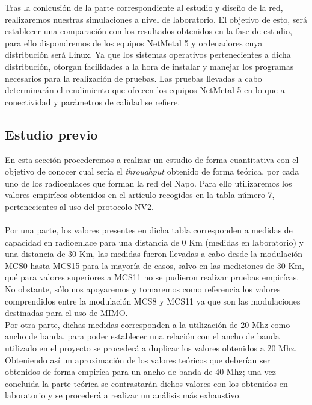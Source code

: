 Tras la conlcusión de la parte correspondiente al estudio y diseño de la red, realizaremos nuestras simulaciones a nivel de laboratorio. El objetivo de esto, será establecer una comparación con los resultados obtenidos en la fase de estudio, para ello dispondremos de los equipos NetMetal 5 y ordenadores cuya distribución será Linux. Ya que los sistemas operativos pertenecientes a dicha distribución, otorgan facilidades a la hora de instalar y manejar los programas necesarios para la realización de pruebas. Las pruebas llevadas a cabo determinarán el rendimiento que ofrecen los equipos NetMetal 5 en lo que a conectividad y parámetros de calidad se refiere.

\subsection{Estudio previo} 
	En esta sección procederemos a realizar un estudio de forma cuantitativa con el objetivo de conocer cual sería el \textit{throughput} obtenido de forma teórica, por cada uno de los radioenlaces que forman la red del Napo. Para ello utilizaremos los valores empirícos obtenidos en el artículo \cite{simo2014assessing} recogidos en la tabla número 7,  pertenecientes al uso del protocolo NV2.\\\\
	
	Por una parte, los valores presentes en dicha tabla corresponden a medidas de capacidad en radioenlace para una distancia de 0 Km (medidas en laboratorio) y una distancia de 30 Km, las medidas fueron llevadas a cabo desde la modulación MCS0 hasta MCS15 para la mayoría de casos, salvo en las mediciones de 30 Km, qué para valores superiores a MCS11 no se pudieron realizar pruebas empirícas. No obstante, sólo nos apoyaremos y tomaremos como referencia los valores comprendidos entre la modulación MCS8 y MCS11 ya que son las modulaciones destinadas para el uso de MIMO. \\
	Por otra parte, dichas medidas corresponden a la utilización de 20 Mhz como ancho de banda, para poder establecer una relación con el ancho de banda utilizado en el proyecto se procederá a duplicar los valores obtenidos a 20 Mhz. Obteniendo así un aproximación de los valores teóricos que deberían ser obtenidos de forma empiríca para un ancho de banda de 40 Mhz; una vez concluida la parte teórica se contrastarán dichos valores con los obtenidos en laboratorio y se procederá a realizar un análisis más exhaustivo.\\\\
	
